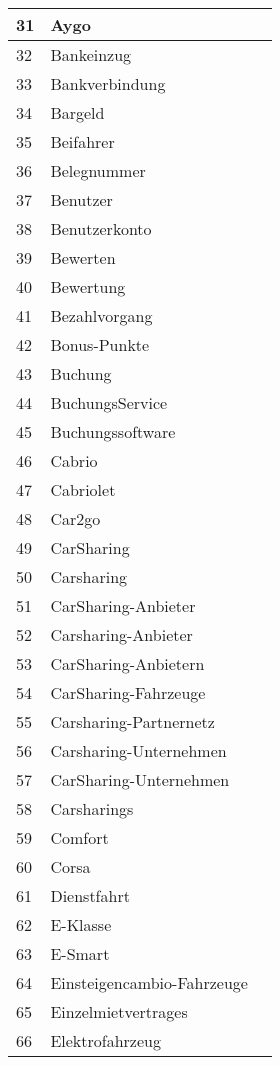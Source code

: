 \begin{longtable}{|m{1.5cm}|m{3cm}|m{8.5cm}|}
	31 & Aygo & \\
	\hline
	32 & Bankeinzug & \\
	\hline
	33 & Bankverbindung & \\
	\hline
	34 & Bargeld & \\
	\hline
	35 & Beifahrer & \\
	\hline
	36 & Belegnummer & \\
	\hline
	37 & Benutzer & \\
	\hline
	38 & Benutzerkonto & \\
	\hline
	39 & Bewerten & \\
	\hline
	40 & Bewertung & \\
	\hline
	41 & Bezahlvorgang & \\
	\hline
	42 & Bonus-Punkte & \\
	\hline
	43 & Buchung & \\
	\hline
	44 & BuchungsService & \\
	\hline
	45 & Buchungssoftware & \\
	\hline
	46 & Cabrio & \\
	\hline
	47 & Cabriolet & \\
	\hline
	48 & Car2go & \\
	\hline
	49 & CarSharing & \\
	\hline
	50 & Carsharing & \\
	\hline
	51 & CarSharing-Anbieter & \\
	\hline
	52 & Carsharing-Anbieter & \\
	\hline
	53 & CarSharing-Anbietern & \\
	\hline
	54 & CarSharing-Fahrzeuge & \\
	\hline
	55 & Carsharing-Partnernetz & \\
	\hline
	56 & Carsharing-Unternehmen & \\
	\hline
	57 & CarSharing-Unternehmen & \\
	\hline
	58 & Carsharings & \\
	\hline
	59 & Comfort & \\
	\hline
	60 & Corsa & \\
	\hline
	61 & Dienstfahrt & \\
	\hline
	62 & E-Klasse & \\
	\hline
	63 & E-Smart & \\
	\hline
	64 & Einsteigencambio-Fahrzeuge & \\
	\hline
	65 & Einzelmietvertrages & \\
	\hline
	66 & Elektrofahrzeug & \\

\end{longtable}
